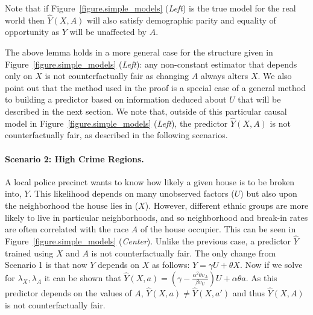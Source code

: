 Note that if Figure~\ref{figure.simple_models} (\emph{Left}) is the true model for the real world then $\hat Y(X,A)$ will also satisfy demographic parity and equality of opportunity as $Y$ will be unaffected by $A$.

The above lemma holds in a more general case for the structure given
in Figure~\ref{figure.simple_models} (\emph{Left}): any non-constant estimator that
depends only on $X$ is not counterfactually fair as changing $A$ always alters $X$.
We also point out that the method used in the proof is a special case
of a general method to building a predictor based on information deduced
about $U$ that will be described in the next section. We note that, outside of this particular causal model in Figure~\ref{figure.simple_models} (\emph{Left}), the predictor $\hat Y(X,A)$ is not counterfactually fair, as described in the following scenarios.
%
%
\paragraph{Scenario 2: High Crime Regions.} 
A local police precinct wants to know how likely a given house is to be broken into, $Y$. This likelihood depends on many unobserved factors
($U$) but also upon the neighborhood the house lies in ($X$). However, different ethnic groups are more likely to live in particular neighborhoods, and so neighborhood and break-in rates are often correlated with the 
race $A$ of the house occupier. This can be seen in Figure~\ref{figure.simple_models} (\emph{Center}). Unlike the previous case, a predictor $\hat Y$ trained using $X$ and $A$ is not counterfactually fair. The only change from Scenario 1 is that now $Y$ depends on $X$ as follows: $Y \!=\! \gamma U + \theta X$. Now if we solve for $\lambda_X,\lambda_A$ it can be shown that $\hat Y(X,a) \!=\! (\gamma - \frac{\alpha^2 \theta v_A}{\beta v_U})U + \alpha \theta a$. As this predictor depends on the values of $A$, $\hat Y(X,a) \!\neq\! \hat Y(X,a')$ and thus $\hat Y(X,A)$ is not counterfactually fair.

